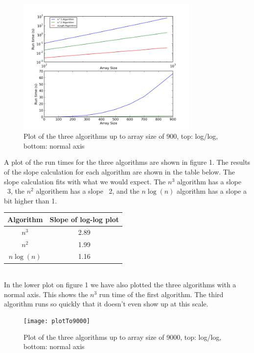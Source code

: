 \documentclass[a4paper,12pt]{article}
\begin{document}
\begin{figure}[h!]
\centering
\includegraphics[width=0.8\textwidth]{plotTo900}
\caption{Plot of the three algorithms up to array size of 900, top: log/log, bottom: normal axis}
\end{figure} 

A plot of the run times for the three algorithms are shown in figure 1.  The results of the slope calculation for each algorithm are shown in the table below.  The slope calculation fits with what we would expect.  The $n^3$ algorithm has a slope ~3, the $n^2$ algorithem has a slope ~2, and the $n\log(n)$ algorithm has a slope a bit higher than 1. \\

\begin{tabular}{|c|c|}
\hline 
Algorithm & Slope of log-log plot \\ 
\hline 
$n^3$ & 2.89 \\ 
\hline 
$n^2$ & 1.99 \\ 
\hline 
$n\log(n)$ & 1.16 \\ 
\hline 
\end{tabular}\\

In the lower plot on figure 1 we have also plotted the three algorithms with a normal axis.  This shows the $n^3$ run time of the first algorithm.  The third algorithm runs so quickly that it doesn't even show up at this scale. 

\begin{figure}[h!]
\centering
\texttt{[image: plotTo9000]}
\caption{Plot of the three algorithms up to array size of 9000, top: log/log, bottom: normal axis}
\end{figure} 
\end{document}
